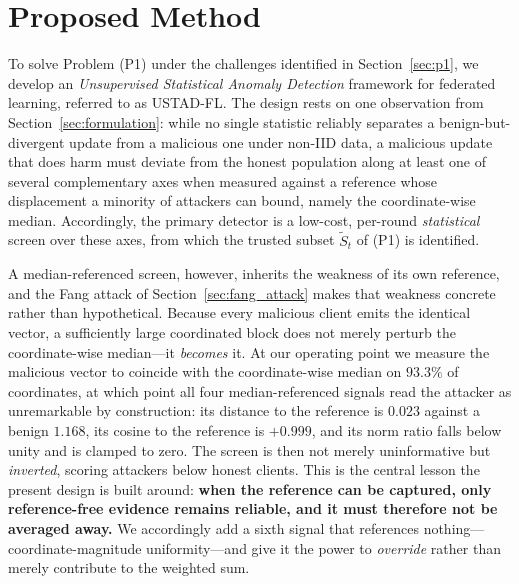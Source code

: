 \documentclass[journal]{IEEEtran}
\begin{document}
\section{Proposed Method}
\label{sec:method}

To solve Problem (P1) under the challenges identified in Section~\ref{sec:p1}, we develop an \emph{Unsupervised Statistical Anomaly Detection} framework for federated learning, referred to as USTAD-FL. The design rests on one observation from Section~\ref{sec:formulation}: while no single statistic reliably separates a benign-but-divergent update from a malicious one under non-IID data, a malicious update that does harm must deviate from the honest population along at least one of several complementary axes when measured against a reference whose displacement a minority of attackers can bound, namely the coordinate-wise median. Accordingly, the primary detector is a low-cost, per-round \emph{statistical} screen over these axes, from which the trusted subset $\widetilde{S}_t$ of (P1) is identified.

A median-referenced screen, however, inherits the weakness of its own reference, and the Fang attack of Section~\ref{sec:fang_attack} makes that weakness concrete rather than hypothetical. Because every malicious client emits the identical vector, a sufficiently large coordinated block does not merely perturb the coordinate-wise median---it \emph{becomes} it. At our operating point we measure the malicious vector to coincide with the coordinate-wise median on $93.3\%$ of coordinates, at which point all four median-referenced signals read the attacker as unremarkable by construction: its distance to the reference is $0.023$ against a benign $1.168$, its cosine to the reference is $+0.999$, and its norm ratio falls below unity and is clamped to zero. The screen is then not merely uninformative but \emph{inverted}, scoring attackers below honest clients. This is the central lesson the present design is built around: \textbf{when the reference can be captured, only reference-free evidence remains reliable, and it must therefore not be averaged away.} We accordingly add a sixth signal that references nothing---coordinate-magnitude uniformity---and give it the power to \emph{override} rather than merely contribute to the weighted sum.
\end{document}
